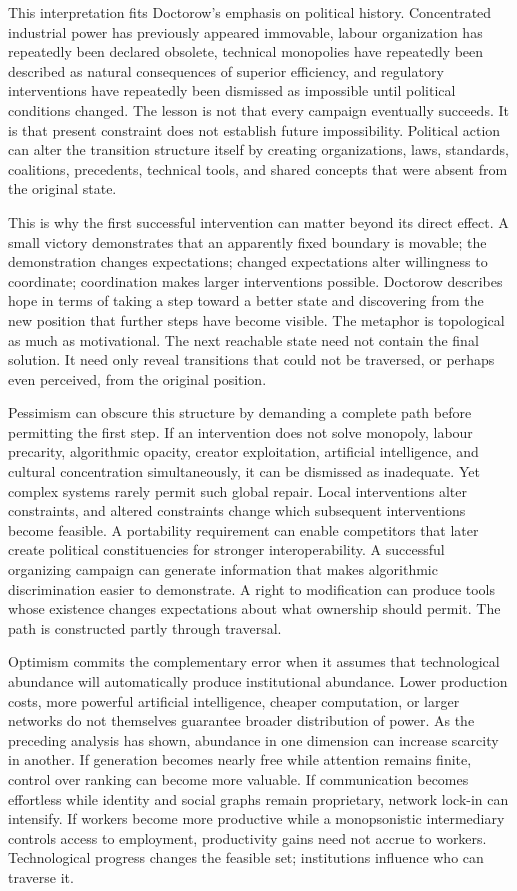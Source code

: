 \documentclass[11pt]{article}
\begin{document}
This interpretation fits Doctorow's emphasis on political history. Concentrated industrial power has previously appeared immovable, labour organization has repeatedly been declared obsolete, technical monopolies have repeatedly been described as natural consequences of superior efficiency, and regulatory interventions have repeatedly been dismissed as impossible until political conditions changed. The lesson is not that every campaign eventually succeeds. It is that present constraint does not establish future impossibility. Political action can alter the transition structure itself by creating organizations, laws, standards, coalitions, precedents, technical tools, and shared concepts that were absent from the original state.

This is why the first successful intervention can matter beyond its direct effect. A small victory demonstrates that an apparently fixed boundary is movable; the demonstration changes expectations; changed expectations alter willingness to coordinate; coordination makes larger interventions possible. Doctorow describes hope in terms of taking a step toward a better state and discovering from the new position that further steps have become visible. The metaphor is topological as much as motivational. The next reachable state need not contain the final solution. It need only reveal transitions that could not be traversed, or perhaps even perceived, from the original position.

Pessimism can obscure this structure by demanding a complete path before permitting the first step. If an intervention does not solve monopoly, labour precarity, algorithmic opacity, creator exploitation, artificial intelligence, and cultural concentration simultaneously, it can be dismissed as inadequate. Yet complex systems rarely permit such global repair. Local interventions alter constraints, and altered constraints change which subsequent interventions become feasible. A portability requirement can enable competitors that later create political constituencies for stronger interoperability. A successful organizing campaign can generate information that makes algorithmic discrimination easier to demonstrate. A right to modification can produce tools whose existence changes expectations about what ownership should permit. The path is constructed partly through traversal.

Optimism commits the complementary error when it assumes that technological abundance will automatically produce institutional abundance. Lower production costs, more powerful artificial intelligence, cheaper computation, or larger networks do not themselves guarantee broader distribution of power. As the preceding analysis has shown, abundance in one dimension can increase scarcity in another. If generation becomes nearly free while attention remains finite, control over ranking can become more valuable. If communication becomes effortless while identity and social graphs remain proprietary, network lock-in can intensify. If workers become more productive while a monopsonistic intermediary controls access to employment, productivity gains need not accrue to workers. Technological progress changes the feasible set; institutions influence who can traverse it.
\end{document}
